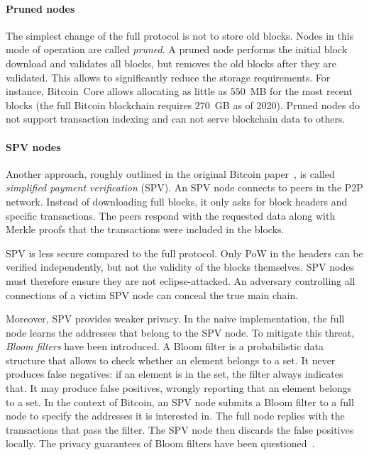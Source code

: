 \paragraph{Pruned nodes}
The simplest change of the full protocol is not to store old blocks.
Nodes in this mode of operation are called \textit{pruned}.
A pruned node performs the initial block download and validates all blocks, but removes the old blocks after they are validated.
This allows to significantly reduce the storage requirements.
For instance, Bitcoin~Core allows allocating as little as $550$~MB for the most recent blocks (the full Bitcoin blockchain requires $270$~GB as of 2020).
Pruned nodes do not support transaction indexing and can not serve blockchain data to others.

\paragraph{SPV nodes}
Another approach, roughly outlined in the original Bitcoin paper~\cite{Nakamoto2008}, is called \textit{simplified payment verification} (SPV).
An SPV node connects to peers in the P2P network.
Instead of downloading full blocks, it only asks for block headers and specific transactions.
The peers respond with the requested data along with Merkle proofs that the transactions were included in the blocks.

SPV is less secure compared to the full protocol.
Only PoW in the headers can be verified independently, but not the validity of the blocks themselves.
SPV nodes must therefore ensure they are not eclipse-attacked.
An adversary controlling all connections of a victim SPV node can conceal the true main chain.

Moreover, SPV provides weaker privacy.
In the naive implementation, the full node learns the addresses that belong to the SPV node.
To mitigate this threat, \textit{Bloom filters} have been introduced.
A Bloom filter is a probabilistic data structure that allows to check whether an element belongs to a set.
It never produces false negatives: if an element is in the set, the filter always indicates that.
It may produce false positives, wrongly reporting that an element belongs to a set.
In the context of Bitcoin, an SPV node submits a Bloom filter to a full node to specify the addresses it is interested in.
The full node replies with the transactions that pass the filter.
The SPV node then discards the false positives locally.
The privacy guarantees of Bloom filters have been questioned~\cite{Gervais2014}.

